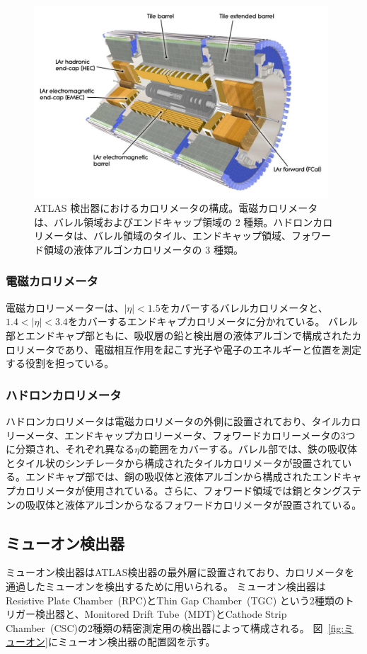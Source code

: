 \begin{figure}[tb]
  \centering
  \includegraphics[clip, width=11cm]{fig/2/Calorimeter_d3.pdf}
  \caption{ATLAS 検出器におけるカロリメータの構成\cite{Aad:1129811}。電磁カロリメータは、バレル領域およびエンドキャップ領域の 2 種類。ハドロンカロリメータは、バレル領域のタイル、エンドキャップ領域、フォワード領域の液体アルゴンカロリメータの 3 種類。}
  \label{fig:カロリメータ}
\end{figure}

\subsubsection{電磁カロリメータ}
電磁カロリーメーターは、$|\eta|<1.5$をカバーするバレルカロリメータと、$1.4<|\eta|<3.4$をカバーするエンドキャプカロリメータに分かれている。
バレル部とエンドキャプ部ともに、吸収層の鉛と検出層の液体アルゴンで構成されたカロリメータであり、電磁相互作用を起こす光子や電子のエネルギーと位置を測定する役割を担っている。

\subsubsection{ハドロンカロリメータ}
ハドロンカロリメータは電磁カロリメータの外側に設置されており、タイルカロリーメータ、エンドキャップカロリーメータ、フォワードカロリーメータの3つに分類され、それぞれ異なる$\eta$の範囲をカバーする。バレル部では、鉄の吸収体とタイル状のシンチレータから構成されたタイルカロリメータが設置されている。エンドキャプ部では、銅の吸収体と液体アルゴンから構成されたエンドキャプカロリメータが使用されている。さらに、フォワード領域では銅とタングステンの吸収体と液体アルゴンからなるフォワードカロリメータが設置されている。

\subsection{ミューオン検出器}\label{section2-2-4}
ミューオン検出器はATLAS検出器の最外層に設置されており、カロリメータを通過したミューオンを検出するために用いられる。
ミューオン検出器はResistive Plate Chamber~(RPC)とThin Gap Chamber~(TGC) という2種類のトリガー検出器と、Monitored Drift Tube~(MDT)とCathode Strip Chamber~(CSC)の2種類の精密測定用の検出器によって構成される。
図~\ref{fig:ミューオン}にミューオン検出器の配置図を示す。

